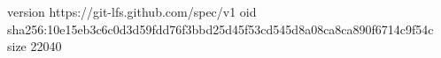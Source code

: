 version https://git-lfs.github.com/spec/v1
oid sha256:10e15eb3c6c0d3d59fdd76f3bbd25d45f53cd545d8a08ca8ca890f6714c9f54c
size 22040
